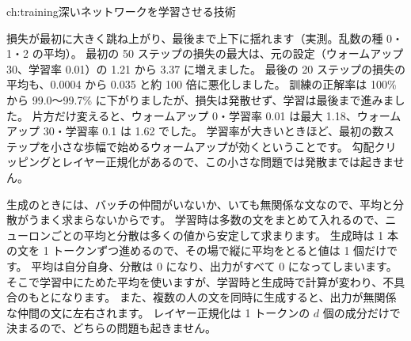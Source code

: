 \begin{answers}{ch:training}{深いネットワークを学習させる技術}
\item 損失が最初に大きく跳ね上がり、最後まで上下に揺れます（実測。乱数の種 0・1・2 の平均）。
最初の 50 ステップの損失の最大は、元の設定（ウォームアップ 30、学習率 0.01）の 1.21 から 3.37 に増えました。
最後の 20 ステップの損失の平均も、0.0004 から 0.035 と約 100 倍に悪化しました。
訓練の正解率は 100\% から 99.0〜99.7\% に下がりましたが、損失は発散せず、学習は最後まで進みました。
片方だけ変えると、ウォームアップ 0・学習率 0.01 は最大 1.18、ウォームアップ 30・学習率 0.1 は 1.62 でした。
学習率が大きいときほど、最初の数ステップを小さな歩幅で始めるウォームアップが効くということです。
勾配クリッピングとレイヤー正規化があるので、この小さな問題では発散までは起きません。
\item 生成のときには、バッチの仲間がいないか、いても無関係な文なので、平均と分散がうまく求まらないからです。
学習時は多数の文をまとめて入れるので、ニューロンごとの平均と分散は多くの値から安定して求まります。
生成時は 1 本の文を 1 トークンずつ進めるので、その場で縦に平均をとると値は 1 個だけです。
平均は自分自身、分散は 0 になり、出力がすべて 0 になってしまいます。
そこで学習中にためた平均を使いますが、学習時と生成時で計算が変わり、不具合のもとになります。
また、複数の人の文を同時に生成すると、出力が無関係な仲間の文に左右されます。
レイヤー正規化は 1 トークンの $d$ 個の成分だけで決まるので、どちらの問題も起きません。
\end{answers}
